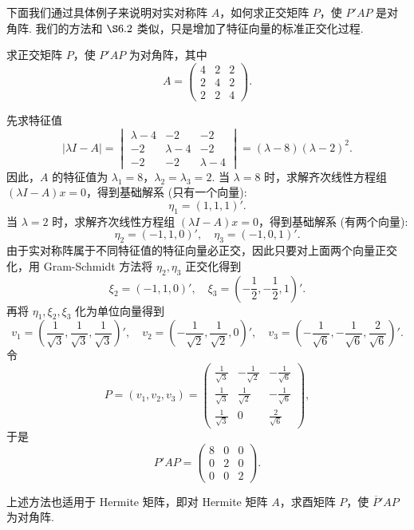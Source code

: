 \documentclass[../../main.tex]{subfiles}%
\begin{document}
下面我们通过具体例子来说明对实对称阵 $A$，如何求正交矩阵 $P$，使 $P'AP$ 是对角阵. 我们的方法和 $\S 6.2$ 类似，只是增加了特征向量的标准正交化过程.
\begin{example}
求正交矩阵 $P$，使 $P'AP$ 为对角阵，其中
\[
A = \begin{pmatrix}
4 & 2 & 2 \\
2 & 4 & 2 \\
2 & 2 & 4
\end{pmatrix}.
\]
\end{example}
\begin{solution}

先求特征值
\[
|\lambda I - A| = 
\begin{vmatrix}
\lambda - 4 & -2 & -2 \\
-2 & \lambda - 4 & -2 \\
-2 & -2 & \lambda - 4
\end{vmatrix}
= (\lambda - 8)(\lambda - 2)^2.
\]
因此，$A$ 的特征值为 $\lambda_1 = 8$，$\lambda_2 = \lambda_3 = 2$. 当 $\lambda = 8$ 时，求解齐次线性方程组 $(\lambda I - A)x = 0$，得到基础解系 (只有一个向量):
\[
\eta_1 = (1,1,1)'.
\]
当 $\lambda = 2$ 时，求解齐次线性方程组 $(\lambda I - A)x = 0$，得到基础解系 (有两个向量):
\[
\eta_2 = (-1,1,0)', \quad \eta_3 = (-1,0,1)'.
\]
由于实对称阵属于不同特征值的特征向量必正交，因此只要对上面两个向量正交化，用 Gram-Schmidt 方法将 $\eta_2,\eta_3$ 正交化得到
\[
\xi_2 = (-1,1,0)', \quad \xi_3 = (-\frac{1}{2},-\frac{1}{2},1)'.
\]
再将 $\eta_1,\xi_2,\xi_3$ 化为单位向量得到
\[
v_1 = (\frac{1}{\sqrt{3}},\frac{1}{\sqrt{3}},\frac{1}{\sqrt{3}})', \quad 
v_2 = (-\frac{1}{\sqrt{2}},\frac{1}{\sqrt{2}},0)', \quad 
v_3 = (-\frac{1}{\sqrt{6}},-\frac{1}{\sqrt{6}},\frac{2}{\sqrt{6}})'.
\]
令
\[
P = (v_1,v_2,v_3) = 
\begin{pmatrix}
\frac{1}{\sqrt{3}} & -\frac{1}{\sqrt{2}} & -\frac{1}{\sqrt{6}} \\
\frac{1}{\sqrt{3}} & \frac{1}{\sqrt{2}} & -\frac{1}{\sqrt{6}} \\
\frac{1}{\sqrt{3}} & 0 & \frac{2}{\sqrt{6}}
\end{pmatrix},
\]
于是
\[
P'AP = 
\begin{pmatrix}
8 & 0 & 0 \\
0 & 2 & 0 \\
0 & 0 & 2
\end{pmatrix}.
\]

\end{solution}
\begin{remark}
上述方法也适用于 Hermite 矩阵，即对 Hermite 矩阵 $A$，求酉矩阵 $P$，使 $\overline{P}'AP$ 为对角阵.
\end{remark}
\end{document}
